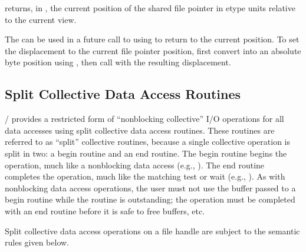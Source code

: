  returns, in ,
the current position of the shared file pointer in etype units
relative to the current
view.

\begin{users}
The  can be used in a future call
to 
using  to return to the current position.
To set the displacement to the current file pointer position,
first convert  into an absolute byte position using
,
then call  with the resulting
displacement.
\end{users}

\subsection{Split Collective Data Access Routines}
\label{sec:io-split-collective}

\MPI/ provides a restricted form of ``nonblocking collective'' I/O
operations for all data accesses
using split collective data access routines.
These routines are referred to as ``split'' collective routines,
because a single collective operation is split in two:
a begin routine and an end routine.
The begin routine begins the operation,
much like a nonblocking data access (e.g., ).
The end routine completes the operation,
much like the matching test or wait (e.g., ).
As with nonblocking data access operations,
the user must not use the buffer
passed to a begin routine while the routine is outstanding;
the operation must be completed with an end routine before it
is safe to free buffers, etc.

Split collective data access operations on a file handle 
are subject to the semantic rules given below.

